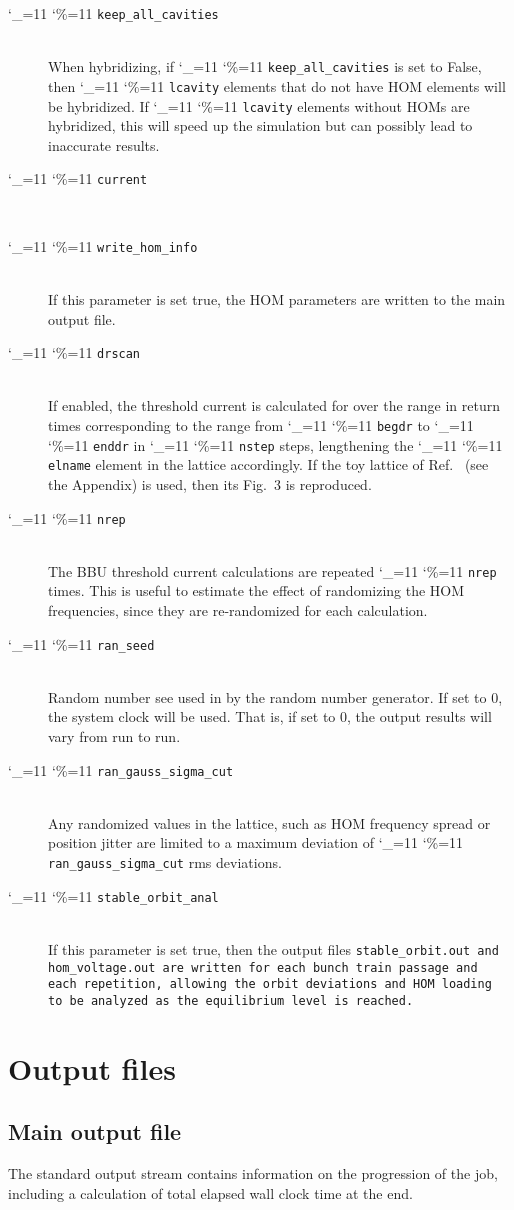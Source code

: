 \documentclass[11pt]{article}
\newcommand\ttcmd{\begingroup\catcode`\_=11 \catcode`\%=11 \dottcmd}
\newcommand\dottcmd[1]{\texttt{#1}\endgroup}
\newcommand{\vn}{\ttcmd}
\newcommand{\Newline}{\hfil \\}
\begin{document}
{\begin{description}
  \item[\vn{keep_all_cavities}] \Newline
When hybridizing, if \vn{keep_all_cavities} is set to False, then
\vn{lcavity} elements that do not have HOM elements will be
hybridized. If \vn{lcavity} elements without HOMs are hybridized, this
will speed up the simulation but can possibly lead to inaccurate
results.
  \item[\vn{current}] \Newline
  \item[\vn{write_hom_info}] \Newline
If this parameter is set true, the HOM parameters are written to the
main output file.
  \item[\vn{drscan}] \Newline
If enabled, the threshold current is calculated for over the range in return times
corresponding to the range from \vn{begdr} to \vn{enddr} in  \vn{nstep} steps,
lengthening the \vn{elname} element in the lattice accordingly. If the toy lattice
of Ref.~\cite{ref:Hoffstaetter04} (see the Appendix) is used, then its Fig.~3 is reproduced.
  \item[\vn{nrep}] \Newline
The BBU threshold current calculations are repeated \vn{nrep} times. This is useful
to estimate the effect of randomizing the HOM frequencies, since they are re-randomized for
each calculation.
  \item[\vn{ran_seed}] \Newline
Random number see used in by the random number generator. If set to 0, the system clock
will be used. That is, if set to 0, the output results will vary from run to run. 
  \item[\vn{ran_gauss_sigma_cut}] \Newline
Any randomized values in the lattice, such as HOM frequency spread or position jitter
are limited to a maximum deviation of \vn{ran_gauss_sigma_cut} rms deviations. 
  \item[\vn{stable_orbit_anal}] \Newline
If this parameter is set true, then the output files \tt{stable_orbit.out} and \tt{hom_voltage.out}
are written for each bunch train passage and each repetition, allowing the orbit deviations
and HOM loading to be analyzed as the equilibrium level is reached.

\end{description}
\section{Output files} 

\subsection{Main output file}
The standard output stream contains information on the progression of the job,
including a calculation of total elapsed wall clock time at the end.
}
\end{document}
